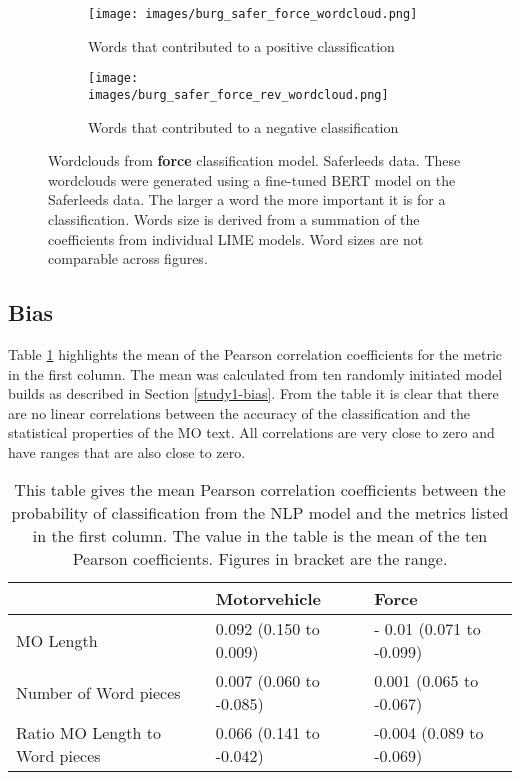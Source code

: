 \begin{figure}
     \centering
     \begin{subfigure}[b]{0.9\textwidth}
         \centering
         \texttt{[image: images/burg\_safer\_force\_wordcloud.png]}
         \caption{Words that contributed to a positive classification}
         \label{fig: wordcloud_force}
     \end{subfigure}
     \vfill
     \begin{subfigure}[b]{0.9\textwidth}
         \centering
         \texttt{[image: images/burg\_safer\_force\_rev\_wordcloud.png]}
         \caption{Words that contributed to a negative classification}
         \label{fig: wordcloud_mv_force}
     \end{subfigure}
        \caption[Wordclouds from \textbf{force} classification model. Saferleeds data.]{{Wordclouds from \textbf{force} classification model. Saferleeds data.} These wordclouds were generated using a fine-tuned BERT model on the Saferleeds data. The larger a word the more important it is for a classification. Words size is derived from a summation of the coefficients from individual LIME models. Word sizes are not comparable across figures.}
        \label{fig:wordcloud_mv_both}
        
\end{figure}

\subsection{Bias} Table \ref{tab:saferleeds_bias} highlights the mean of the Pearson correlation coefficients for the metric in the first column. The mean was calculated from ten randomly initiated model builds as described in Section \ref{study1-bias}. From the table it is clear that there are no linear correlations between the accuracy of the classification and the statistical properties of the MO text. All correlations are very close to zero and have ranges that are also close to zero.


\begin{table}[]
\begin{tabular}{@{}lll@{}}
\toprule
                               & Motorvehicle            & Force                    \\ \midrule
MO Length                      & 0.092 (0.150 to 0.009)  & - 0.01 (0.071 to -0.099) \\
Number of Word pieces          & 0.007 (0.060 to -0.085) & 0.001 (0.065 to -0.067)  \\
Ratio MO Length to Word pieces & 0.066 (0.141 to -0.042) & -0.004 (0.089 to -0.069) \\ \bottomrule
\end{tabular}

\caption[PF1 data - bias results]{\label{tab:saferleeds_bias} This table gives the mean Pearson correlation coefficients between the probability of classification from the NLP model and the metrics listed in the first column.  The value in the table is the mean of the ten Pearson coefficients. Figures in bracket are the range.}
\end{table}





